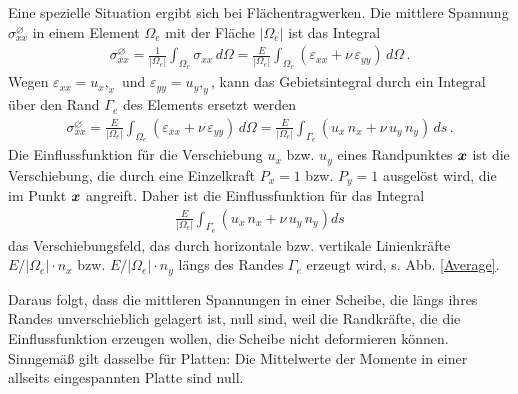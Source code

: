 Eine spezielle Situation ergibt sich bei Fl\"{a}chentragwerken. Die mittlere Spannung $\sigma_{xx}^{\varnothing}$ in einem Element $\Omega_e$ mit der Fl\"{a}che $|\Omega_e|$ ist das Integral
\begin{align}
\sigma_{xx}^\varnothing = \frac{1}{|\Omega_e|}\int_{\Omega_e} \sigma_{xx}\,d\Omega =
\frac{E}{|\Omega_e|}\int_{\Omega_e} (\varepsilon_{xx} + \nu\,\varepsilon_{yy})\,d\Omega\,.
\end{align}
Wegen $\varepsilon_{xx} = u_x,_x$ und $\varepsilon_{yy} = u_y,_y$, kann das Gebietsintegral durch ein Integral \"{u}ber den Rand $\Gamma_e$ des Elements ersetzt werden
\begin{align}
\sigma_{xx}^\varnothing = \frac{E}{|\Omega_e|}\int_{\Omega_e}  (\varepsilon_{xx} +
\nu\,\varepsilon_{yy})\,d\Omega = \frac{E}{|\Omega_e|}\int_{\Gamma_e} (u_x\,n_x +
\nu\,u_y\,n_y) \,ds\,.
\end{align}
Die Einflussfunktion f\"{u}r die Verschiebung $u_x$ bzw. $u_y$ eines Randpunktes $\mbox{\boldmath $x$}$ ist die Verschiebung, die durch eine Einzelkraft $P_x = 1$ bzw. $P_y = 1$ ausgel\"{o}st wird, die im Punkt $\mbox{\boldmath $x$}$ angreift. Daher ist die Einflussfunktion f\"{u}r das Integral
\begin{align}
\frac{E}{|\Omega_e|}\int_{\Gamma_e} (u_x\,n_x + \nu\,u_y\,n_y) ds
\end{align}
das Verschiebungsfeld, das durch horizontale bzw. vertikale Linienkr\"{a}fte $E/|\Omega_e|
\cdot n_x$ bzw. $E/|\Omega_e| \cdot n_y$ l\"{a}ngs des Randes $\Gamma_e$ erzeugt wird, s. Abb. \ref{Average}.

Daraus folgt, dass die mittleren Spannungen in einer Scheibe, die l\"{a}ngs ihres Randes unverschieblich gelagert ist, null sind, weil die Randkr\"{a}fte, die die Einflussfunktion erzeugen wollen, die Scheibe nicht deformieren k\"{o}nnen. Sinngem\"{a}{\ss} gilt dasselbe f\"{u}r Platten: Die Mittelwerte der Momente in einer allseits eingespannten Platte sind null.

